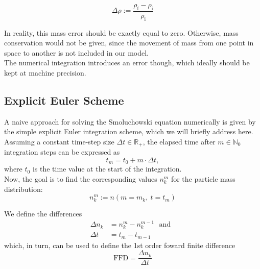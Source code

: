         
        \begin{equation}
            \Delta\rho
                :=\frac{\rho_\text{f}-\rho_\text{i}}{\rho_\text{i}}
        \end{equation}

        In reality, this mass error should be exactly equal to zero. Otherwise, mass conservation would not be given, since the movement of mass from one point in space to another is not included in our model. \\
        
        The numerical integration introduces an error though, which ideally should be kept at machine precision. %

    \subsection{Explicit Euler Scheme}

        A naive approach for solving the Smoluchowski equation numerically is given by the simple 
        explicit Euler integration scheme, which we will briefly address here. Assuming a constant 
        time-step size $\Delta t\in\mathbb R_+$, the elapsed time after $m\in\mathbb N_0$ integration 
        steps can be expressed as 
        \begin{equation}
            t_m
                =t_0+m\cdot\Delta t,
        \end{equation}
        where $t_0$ is the time value at the start of the integration.\\
        
        Now, the goal is to find the corresponding values $n_k^m$ for the particle mass 
        distribution:
        \begin{equation}
            n_k^m
                :=n(m=m_k,\ t=t_m)
        \end{equation}
        
        We define the differences
        \begin{align}
            \Delta n_k
                &=n_k^m-n_k^{m-1}
            \ \ \ \text{and}\ \ \
            \\
            \Delta t
                &=t_m-t_{m-1}
        \end{align}
        which, in turn, can be used to define the 1st order foward finite difference
        \begin{equation}
            \text{FFD}
                =\frac{\Delta n_k}{\Delta t}
        \end{equation}
        
